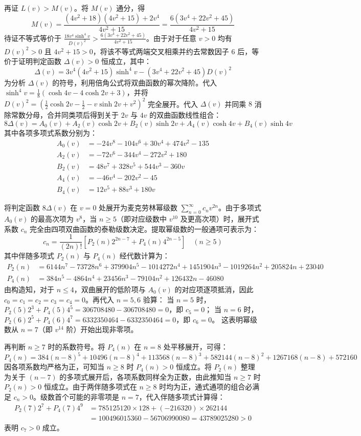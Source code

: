 \begin{solution}
再证 $L(v) > M(v)$。将 $M(v)$ 通分，得
$$ M(v) = \frac{(4v^2+18)(4v^2+15) + 2v^4}{4v^2 + 15} = \frac{6(3v^4 + 22v^2 + 45)}{4v^2 + 15} $$
待证不等式等价于 $\frac{18 v^4 \sinh^4 v}{D(v)^2} > \frac{6(3v^4 + 22v^2 + 45)}{4v^2 + 15}$。由于对于任意 $v > 0$ 均有 $D(v)^2 > 0$ 且 $4v^2+15 > 0$，将该不等式两端交叉相乘并约去常数因子 $6$ 后，等价于证明判定函数 $\Delta(v) > 0$ 恒成立，其中：
$$ \Delta(v) = 3v^4 (4v^2+15) \sinh^4 v - (3v^4+22v^2+45) D(v)^2 $$
为分析 $\Delta(v)$ 的符号，利用倍角公式将双曲函数的幂次降阶。代入 $\sinh^4 v = \frac{1}{8}(\cosh 4v - 4\cosh 2v + 3)$，并将 $D(v)^2 = \left(\frac{1}{2}\cosh 2v - \frac{1}{2} - v\sinh 2v + v^2\right)^2$ 完全展开。代入 $\Delta(v)$ 并同乘 $8$ 消除常数分母，合并同类项后得到关于 $2v$ 与 $4v$ 的双曲函数线性组合：
$$ 8\Delta(v) = A_0(v) + A_2(v)\cosh 2v + B_2(v)\sinh 2v + A_4(v)\cosh 4v + B_4(v)\sinh 4v $$
其中各项多项式系数分别为：
\begin{align*}
A_0(v) &= -24v^8 - 104v^6 + 30v^4 + 474v^2 - 135 \\
A_2(v) &= -72v^6 - 344v^4 - 272v^2 + 180 \\
B_2(v) &= 48v^7 + 328v^5 + 544v^3 - 360v \\
A_4(v) &= -46v^4 - 202v^2 - 45 \\
B_4(v) &= 12v^5 + 88v^3 + 180v
\end{align*}

将判定函数 $8\Delta(v)$ 在 $v=0$ 处展开为麦克劳林幂级数 $\sum_{n=0}^{\infty} c_n v^{2n}$。由于多项式 $A_0(v)$ 的最高次项为 $v^8$，当 $n \ge 5$（即对应级数中 $v^{10}$ 及更高次项）时，展开式系数 $c_n$ 完全由四项双曲函数的泰勒级数决定。提取幂级数的一般通项可表示为：
$$ c_n = \frac{1}{(2n)!} \left[ P_2(n) 2^{2n-7} + P_4(n) 4^{2n-5} \right] \quad (n \ge 5) $$
其中伴随多项式 $P_2(n)$ 与 $P_4(n)$ 经代数计算为：
\begin{align*}
P_2(n) &= 6144 n^7 - 73728 n^6 + 379904 n^5 - 1014272 n^4 + 1451904 n^3 - 1019264 n^2 + 205824 n + 23040 \\
P_4(n) &= 384 n^5 - 4864 n^4 + 23456 n^3 - 79104 n^2 + 126432 n - 46080
\end{align*}
由构造知，对于 $n \le 4$，双曲展开的低阶项与 $A_0(v)$ 的对应项逐项抵消，因此 $c_0 = c_1 = c_2 = c_3 = c_4 = 0$。再代入 $n=5,6$ 验算：
当 $n=5$ 时，$P_2(5) 2^3 + P_4(5) 4^5 = 306708480 - 306708480 = 0$，即 $c_5 = 0$；
当 $n=6$ 时，$P_2(6) 2^5 + P_4(6) 4^7 = 6332350464 - 6332350464 = 0$，即 $c_6 = 0$。
这表明幂级数从 $n=7$（即 $v^{14}$ 阶）开始出现非零项。

再判断 $n \ge 7$ 时的系数符号。将 $P_4(n)$ 在 $n=8$ 处平移展开，可得：
$$ P_4(n) = 384(n-8)^5 + 10496(n-8)^4 + 113568(n-8)^3 + 582144(n-8)^2 + 1267168(n-8) + 572160 $$
因各项系数均严格为正，可知当 $n \ge 8$ 时 $P_4(n) > 0$ 恒成立。将 $P_2(n)$ 整理为关于 $(n-7)$ 的多项式展开后，各项系数同样全为正数，由此推知当 $n \ge 7$ 时 $P_2(n) > 0$ 恒成立。由于两伴随多项式在 $n \ge 8$ 时均为正，通式通项的组合必满足 $c_n > 0$。级数首个可能的非零项是 $n=7$，代入伴随多项式计算得：
\begin{align*} P_2(7) 2^7 + P_4(7) 4^9 &= 785125120 \times 128 + (-216320) \times 262144 \\
&= 100496015360 - 56706990080 = 43789025280 > 0 \end{align*}
表明 $c_7 > 0$ 成立。


\end{solution}

